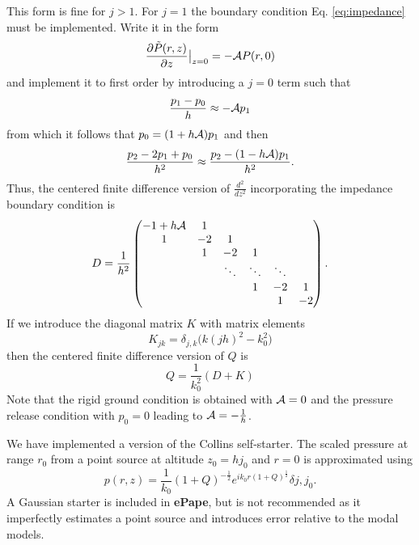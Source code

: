 This form is fine for $j>1$. For $j=1$ the boundary condition Eq. \ref{eq:impedance} must be implemented. Write it in the form 
\[
\frac{\partial \tilde P(r,z)}{\partial z}\big|_{z=0}=-{\cal A}P(r,0)
\]
and implement it to first order by introducing a $j=0$ term such that 
\[
\frac{p_1-p_0}{h}\approx -{\cal A}p_1
\]
from which it follows that $p_0=(1+h{\cal A})p_1$ and then 
\[
\frac{p_{2}-2p_1+p_0}{h^2}\approx \frac{p_{2}-(1-h{\cal A})p_1}{h^2}.
\]
Thus, the centered finite difference version of $\frac{d^2}{dz^2}$ incorporating the impedance boundary condition is 
\begin{equation}\label{eq:Discrete_d^2}
D=
\frac{1}{h^2}\begin{pmatrix}
-1+h{\cal A}&1& &&&\\
1&-2&1&&&\\
&1&-2&1&&\\
&&\ddots&\ddots&\ddots&\\
&&& 1&-2&1\\
&&& &1&-2
\end{pmatrix}.
\end{equation}
If we introduce the diagonal matrix $K$ with matrix elements 
\[
K_{jk}=\delta_{j,k} \Big(k(jh)^2-k_0^2)
\]
then the centered finite difference version of $Q$ is 
\begin{equation} 
Q=\frac{1}{k_0^2}(D+K)
\label{eq:Q_FD_matrix_def}\end{equation}
Note that the rigid ground condition is obtained with ${\cal A}=0$ and the pressure release condition with $p_0=0$ leading to ${\cal A}=-\frac{1}{h}$.

We have implemented a version of the Collins self-starter\cite{collins1992self,collins1999stabilized}. The scaled pressure at range $r_0$ from a point source at altitude $z_0=hj_0$ and $r=0$ is approximated using 
\[
p(r,z)=\frac{1}{k_0}(1+Q)^{-\frac{1}{2}} e^{ik_0 r (1+Q)^{\frac{1}{2}}}\delta{j,j_0}. 
\]
A Gaussian starter is included in {\bf ePape}, but is not recommended as it imperfectly estimates a point source and introduces error relative to the modal models. 

